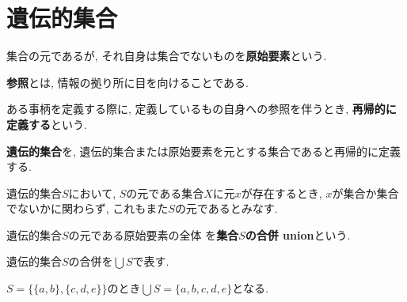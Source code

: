\section{遺伝的集合}
\begin{Def}
集合の元であるが, それ自身は集合でないものを{\bf 原始要素}という.
\end{Def}
\begin{mean}
{\bf 参照}とは, 情報の拠り所に目を向けることである.
\end{mean}
\begin{usage}
ある事柄を定義する際に, 定義しているもの自身への参照を伴うとき, {\bf 再帰的に定義する}という.
\end{usage}
\begin{Def}
{\bf 遺伝的集合}を, 遺伝的集合または原始要素を元とする集合であると再帰的に定義する.
\end{Def}
\begin{caution}
遺伝的集合$S$において, $S$の元である集合$X$に元$x$が存在するとき, $x$が集合か集合でないかに関わらず, これもまた$S$の元であるとみなす.
\end{caution}
\begin{Def}
遺伝的集合$S$の元である原始要素の全体
を{\bf 集合$S$の合併 union}という.
\end{Def}
\begin{Notation}
遺伝的集合$S$の合併を$\bigcup S$で表す.
\end{Notation}
\begin{example}
$S=\{\{a,b\},\{c,d,e\}\}$のとき$\bigcup S=\{a,b,c,d,e\}$となる.
\end{example}
